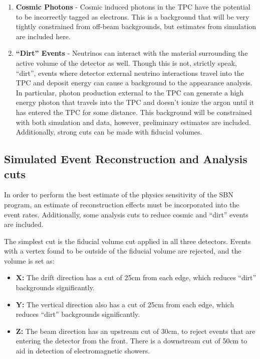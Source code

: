 \begin{enumerate}
  \item {\bf Cosmic Photons} - Cosmic induced photons in the TPC have the potential to be incorrectly tagged as electrons. This is a background that will be very tightly constrained from off-beam backgrounds, but estimates from simulation are included here.

  \item{\bf ``Dirt'' Events} - Neutrinos can interact with the material surrounding the active volume of the detector as well.  Though this is not, strictly speak, ``dirt'', events where detector external neutrino interactions travel into the TPC and deposit energy can cause a background to the \nue appearance analysis.  In particular, photon production external to the TPC can generate a high energy photon that travels into the TPC and doesn't ionize the argon until it has entered the TPC for some distance.  This background will be constrained with both simulation and data, however, preliminary estimates are included.  Additionally, strong cuts can be made with fiducial volumes.

\end{enumerate}


\subsection{Simulated Event Reconstruction and Analysis cuts}
\label{subsection:event_reco}

In order to perform the best estimate of the physics sensitivity of the SBN program, an estimate of reconstruction effects must be incorporated into the event rates.  Additionally, some analysis cuts to reduce cosmic and ``dirt'' events are included.

The simplest cut is the fiducial volume cut applied in all three detectors.  Events with a vertex found to be outside of the fiducial volume are rejected, and the volume is set as:
\begin{itemize}
\item{\bf X:} The drift direction has a cut of 25cm from each edge, which reduces ``dirt'' backgrounds significantly.
\item{\bf Y:} The vertical direction also has a cut of 25cm from each edge, which reduces ``dirt'' backgrounds significantly.
\item{\bf Z:} The beam direction has an upstream cut of 30cm, to reject events that are entering the detector from the front.  There is a downstream cut of 50cm to aid in detection of electromagnetic showers.
\end{itemize}

